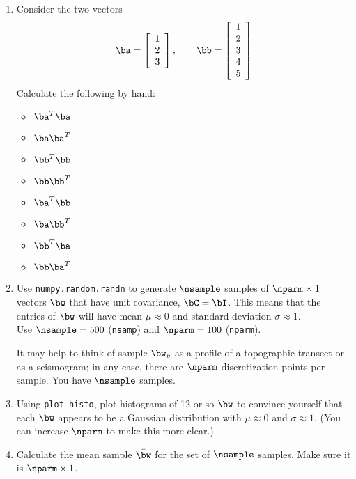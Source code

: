 \documentclass[11pt,titlepage,fleqn]{article}
\begin{document}
\begin{enumerate}
\item Consider the two vectors
%
\begin{equation*}
\ba =  \left[ \begin{array}{r} 1 \\ 2 \\ 3 \end{array} \right],
\quad\quad
\bb =  \left[ \begin{array}{r} 1 \\ 2 \\ 3 \\ 4 \\ 5 \end{array} \right]
\end{equation*}
%
Calculate the following by hand:
%
\begin{itemize}
\item $\ba^T \ba$
\item $\ba \ba^T$
\item $\bb^T \bb$
\item $\bb \bb^T$
\item $\ba^T \bb$
\item $\ba \bb^T$
\item $\bb^T \ba$
\item $\bb \ba^T$
\end{itemize}

\item Use \verb+numpy.random.randn+ to generate $\nsample$ samples of $\nparm \times 1$ vectors $\bw$ that have unit covariance, $\bC = \bI$.
This means that the entries of $\bw$ will have mean $\mu \approx 0$ and standard deviation $\sigma \approx 1$. \\
Use $\nsample = 500$ (\verb+nsamp+) and $\nparm = 100$ (\verb+nparm+).

It may help to think of sample $\bw_p$ as a profile of a topographic transect or as a seismogram; in any case, there are $\nparm$ discretization points per sample. You have $\nsample$ samples.

\item Using \verb+plot_histo+, plot histograms of 12 or so $\bw$ to convince yourself that each $\bw$ appears to be a Gaussian distribution with $\mu \approx 0$ and $\sigma \approx 1$. (You can increase $\nparm$ to make this more clear.)

\item Calculate the mean sample $\bar{\bw}$ for the set of $\nsample$ samples. Make sure it is $\nparm \times 1$.


\end{enumerate}
\end{document}
